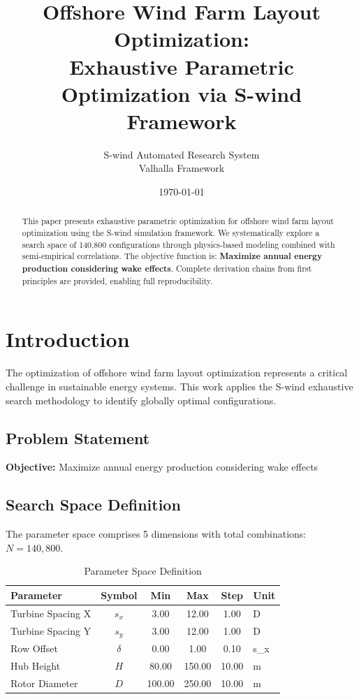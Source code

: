 \documentclass[11pt,twocolumn]{article}
\title{Offshore Wind Farm Layout Optimization: \\Exhaustive Parametric Optimization via S-wind Framework}
\author{S-wind Automated Research System\\Valhalla Framework}
\date{\today}
\begin{document}
\maketitle

\begin{abstract}
This paper presents exhaustive parametric optimization for offshore wind farm layout optimization using the S-wind simulation framework.
We systematically explore a search space of 140,800 configurations through physics-based modeling
combined with semi-empirical correlations. The objective function is: \textbf{Maximize annual energy production considering wake effects}.
Complete derivation chains from first principles are provided, enabling full reproducibility.
\end{abstract}

\section{Introduction}
The optimization of offshore wind farm layout optimization represents a critical challenge in sustainable energy systems.
This work applies the S-wind exhaustive search methodology to identify globally optimal configurations.

\subsection{Problem Statement}
\textbf{Objective:} Maximize annual energy production considering wake effects

\subsection{Search Space Definition}
The parameter space comprises 5 dimensions with total combinations: $N = 140,800$.

\begin{table}[h]
\centering
\caption{Parameter Space Definition}
\begin{tabular}{@{}lccccl@{}}
\toprule
Parameter & Symbol & Min & Max & Step & Unit \\
\midrule
Turbine Spacing X & $s_x$ & 3.00 & 12.00 & 1.00 & D \\
Turbine Spacing Y & $s_y$ & 3.00 & 12.00 & 1.00 & D \\
Row Offset & $\delta$ & 0.00 & 1.00 & 0.10 & s_x \\
Hub Height & $H$ & 80.00 & 150.00 & 10.00 & m \\
Rotor Diameter & $D$ & 100.00 & 250.00 & 10.00 & m \\
\bottomrule
\end{tabular}
\end{table}
\end{document}
